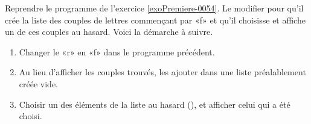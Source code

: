 
\begin{exercice}\label{exoPremiere-0072}

    Reprendre le programme de l'exercice \ref{exoPremiere-0054}. Le modifier pour qu'il crée la liste des couples de lettres commençant par «f» et qu'il choisisse et affiche un de ces couples au hasard. Voici la démarche à suivre.
    \begin{enumerate}
        \item
            Changer le «r» en «f» dans le programme précédent.
        \item
            Au lieu d'afficher les couples trouvés, les ajouter dans une liste préalablement créée vide.
        \item
            Choisir un des éléments de la liste au hasard (), et afficher celui qui a été choisi.
    \end{enumerate}

\end{exercice}
